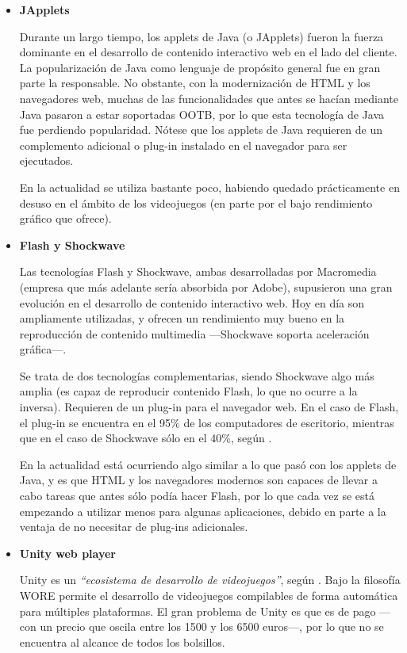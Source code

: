 \begin{itemize}

\item{\bf JApplets}

Durante un largo tiempo, los applets de Java (o JApplets) fueron la fuerza dominante en el desarrollo de contenido interactivo web en el lado del cliente. La popularización de Java como lenguaje de propósito general fue en gran parte la responsable. No obstante, con la modernización de \acs{HTML} y los navegadores web, muchas de las funcionalidades que antes se hacían mediante Java pasaron a estar soportadas \acs{OOTB}, por lo que esta tecnología de Java fue perdiendo popularidad. Nótese que los applets de Java requieren de un complemento adicional o plug-in instalado en el navegador para ser ejecutados.

En la actualidad se utiliza bastante poco, habiendo quedado prácticamente en desuso en el ámbito de los videojuegos (en parte por el bajo rendimiento gráfico que ofrece).

\item{\bf Flash y Shockwave}

Las tecnologías Flash y Shockwave, ambas desarrolladas por Macromedia (empresa que más adelante sería absorbida por Adobe), supusieron una gran evolución en el desarrollo de contenido interactivo web. Hoy en día son ampliamente utilizadas, y ofrecen un rendimiento muy bueno en la reproducción de contenido multimedia ---Shockwave soporta aceleración gráfica---.

Se trata de dos tecnologías complementarias, siendo Shockwave algo más amplia (es capaz de reproducir contenido Flash, lo que no ocurre a la inversa). Requieren de un plug-in para el navegador web. En el caso de Flash, el plug-in se encuentra en el 95\% de los computadores de escritorio, mientras que en el caso de Shockwave sólo en el 40\%, según \cite{w3techs}.

En la actualidad está ocurriendo algo similar a lo que pasó con los applets de Java, y es que \acs{HTML} y los navegadores modernos son capaces de llevar a cabo tareas que antes sólo podía hacer Flash, por lo que cada vez se está empezando a utilizar menos para algunas aplicaciones, debido en parte a la ventaja de no necesitar de plug-ins adicionales.

\item{\bf Unity web player}

Unity es un {\it ``ecosistema de desarrollo de videojuegos''}, según \cite{unity}. Bajo la filosofía \acf{WORE} permite el desarrollo de videojuegos compilables de forma automática para múltiples plataformas. El gran problema de Unity es que es de pago ---con un precio que oscila entre los 1500 y los 6500 euros---, por lo que no se encuentra al alcance de todos los bolsillos.


\end{itemize}
